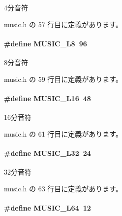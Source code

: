 4分音符 



 music.\+h の 57 行目に定義があります。

\paragraph[{M\+U\+S\+I\+C\+\_\+\+L8}]{\setlength{\rightskip}{0pt plus 5cm}\#define M\+U\+S\+I\+C\+\_\+\+L8~96}\label{music_8h_aed1118b9891aebc618d044baeef53056_aed1118b9891aebc618d044baeef53056}


8分音符 



 music.\+h の 59 行目に定義があります。

\paragraph[{M\+U\+S\+I\+C\+\_\+\+L16}]{\setlength{\rightskip}{0pt plus 5cm}\#define M\+U\+S\+I\+C\+\_\+\+L16~48}\label{music_8h_ac38d2aa39e73d6bf993e350e43172fc2_ac38d2aa39e73d6bf993e350e43172fc2}


16分音符 



 music.\+h の 61 行目に定義があります。

\paragraph[{M\+U\+S\+I\+C\+\_\+\+L32}]{\setlength{\rightskip}{0pt plus 5cm}\#define M\+U\+S\+I\+C\+\_\+\+L32~24}\label{music_8h_a63721aef2801ea3c18b73eeb6a1bb28f_a63721aef2801ea3c18b73eeb6a1bb28f}


32分音符 



 music.\+h の 63 行目に定義があります。

\paragraph[{M\+U\+S\+I\+C\+\_\+\+L64}]{\setlength{\rightskip}{0pt plus 5cm}\#define M\+U\+S\+I\+C\+\_\+\+L64~12}\label{music_8h_ab39506114b70023be5b84b891acac4f5_ab39506114b70023be5b84b891acac4f5}


